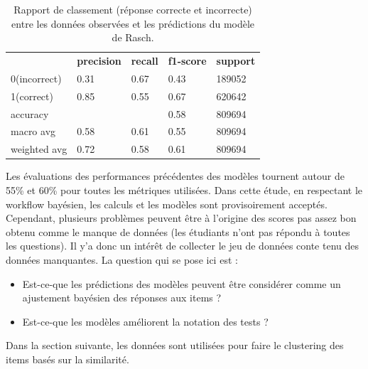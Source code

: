 \begin{table}[H]
	\centering
	\begin{tabular}{m{4cm}m{2cm}m{2cm}m{2cm}m{2cm}}
	& \textbf{precision} & \textbf{recall} & \textbf{f1-score} &  \textbf{support} \\
	
	0(incorrect) & 0.31 & 0.67 & 0.43 & 189052 \\ 
	1(correct) & 0.85 & 0.55 & 0.67 & 620642\\ 
	accuracy &  & & 0.58 & 809694 \\ 
	macro avg  & 0.58 & 0.61 & 0.55 & 809694\\ 
	weighted avg  & 0.72 & 0.58 & 0.61 & 809694\\ 
	\end{tabular}
	\caption{Rapport de classement (réponse correcte et incorrecte) entre les données observées et les prédictions du modèle de Rasch.}
\end{table}

\noindent Les évaluations des performances précédentes des modèles tournent autour de 55\% et 60\% pour toutes les métriques utilisées. Dans cette étude, en respectant le workflow bayésien, les calculs et les modèles sont provisoirement acceptés. Cependant, plusieurs problèmes peuvent être à l’origine des scores pas assez bon obtenu comme le manque de données (les étudiants n’ont pas répondu à toutes les questions). Il y’a donc un intérêt de collecter le jeu de données conte tenu des données manquantes. La question qui se pose ici est :
\begin{itemize}
	\item Est-ce-que les prédictions des modèles peuvent être considérer comme un ajustement bayésien des réponses aux items ?
	\item Est-ce-que les modèles améliorent la notation des tests ?
\end{itemize}

\noindent Dans la section suivante, les données sont utilisées pour faire le clustering des items basés sur la similarité.


